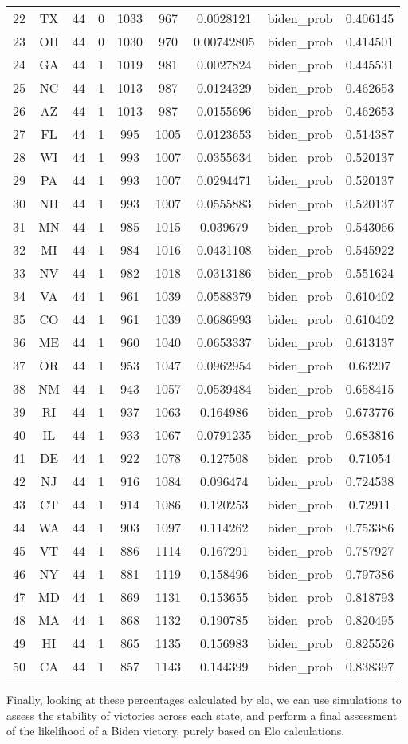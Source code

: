 \documentclass[12pt,a4paper]{article}
\begin{document}
\begin{tabular}{r|cccccccc}
	22 & TX & 44 & 0 & 1033 & 967 & 0.0028121 & biden\_prob & 0.406145 \\
	23 & OH & 44 & 0 & 1030 & 970 & 0.00742805 & biden\_prob & 0.414501 \\
	24 & GA & 44 & 1 & 1019 & 981 & 0.0027824 & biden\_prob & 0.445531 \\
	25 & NC & 44 & 1 & 1013 & 987 & 0.0124329 & biden\_prob & 0.462653 \\
	26 & AZ & 44 & 1 & 1013 & 987 & 0.0155696 & biden\_prob & 0.462653 \\
	27 & FL & 44 & 1 & 995 & 1005 & 0.0123653 & biden\_prob & 0.514387 \\
	28 & WI & 44 & 1 & 993 & 1007 & 0.0355634 & biden\_prob & 0.520137 \\
	29 & PA & 44 & 1 & 993 & 1007 & 0.0294471 & biden\_prob & 0.520137 \\
	30 & NH & 44 & 1 & 993 & 1007 & 0.0555883 & biden\_prob & 0.520137 \\
	31 & MN & 44 & 1 & 985 & 1015 & 0.039679 & biden\_prob & 0.543066 \\
	32 & MI & 44 & 1 & 984 & 1016 & 0.0431108 & biden\_prob & 0.545922 \\
	33 & NV & 44 & 1 & 982 & 1018 & 0.0313186 & biden\_prob & 0.551624 \\
	34 & VA & 44 & 1 & 961 & 1039 & 0.0588379 & biden\_prob & 0.610402 \\
	35 & CO & 44 & 1 & 961 & 1039 & 0.0686993 & biden\_prob & 0.610402 \\
	36 & ME & 44 & 1 & 960 & 1040 & 0.0653337 & biden\_prob & 0.613137 \\
	37 & OR & 44 & 1 & 953 & 1047 & 0.0962954 & biden\_prob & 0.63207 \\
	38 & NM & 44 & 1 & 943 & 1057 & 0.0539484 & biden\_prob & 0.658415 \\
	39 & RI & 44 & 1 & 937 & 1063 & 0.164986 & biden\_prob & 0.673776 \\
	40 & IL & 44 & 1 & 933 & 1067 & 0.0791235 & biden\_prob & 0.683816 \\
	41 & DE & 44 & 1 & 922 & 1078 & 0.127508 & biden\_prob & 0.71054 \\
	42 & NJ & 44 & 1 & 916 & 1084 & 0.096474 & biden\_prob & 0.724538 \\
	43 & CT & 44 & 1 & 914 & 1086 & 0.120253 & biden\_prob & 0.72911 \\
	44 & WA & 44 & 1 & 903 & 1097 & 0.114262 & biden\_prob & 0.753386 \\
	45 & VT & 44 & 1 & 886 & 1114 & 0.167291 & biden\_prob & 0.787927 \\
	46 & NY & 44 & 1 & 881 & 1119 & 0.158496 & biden\_prob & 0.797386 \\
	47 & MD & 44 & 1 & 869 & 1131 & 0.153655 & biden\_prob & 0.818793 \\
	48 & MA & 44 & 1 & 868 & 1132 & 0.190785 & biden\_prob & 0.820495 \\
	49 & HI & 44 & 1 & 865 & 1135 & 0.156983 & biden\_prob & 0.825526 \\
	50 & CA & 44 & 1 & 857 & 1143 & 0.144399 & biden\_prob & 0.838397 \\
\end{tabular}


Finally, looking at these percentages calculated by elo, we can use simulations to assess the stability of victories across each state, and perform a final assessment of the likelihood of a Biden victory, purely based on Elo calculations.  
\end{document}
